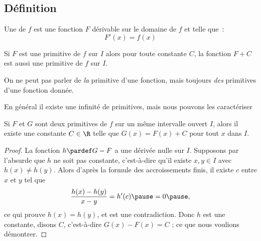 \subsection{Définition}
\begin{frame}
  \begin{definition}\pause{}
    Une  de $f$ est une fonction $F$ dérivable sur le domaine de \(f\) et telle que~:
    \begin{equation*}
      F'(x) = f(x)
    \end{equation*}
  \end{definition}
  \begin{remark}\pause{}
    Si $F$ est une primitive de $f$ sur $I$ alors pour toute constante \(C\), la fonction $F+C$ est aussi une primitive de $f$ sur $I$.
  \end{remark}
  \begin{remark*}\pause{}
    On ne peut pas parler de \emph{la} primitive d'une fonction, mais toujours \emph{des} primitives d'une fonction donnée.
  \end{remark*}
\end{frame}

\begin{frame}
  En général il existe une infinité de primitives, mais nous pouvons les caractériser\pause{}
  \begin{proposition}
    Si $F$ et $G$ sont deux primitives de $f$ sur un même intervalle ouvert $I$,\pause{} alors il existe une constante $C \in \R$ telle que $G(x)=F(x)+C$ pour tout $x$ dans $I$.
  \end{proposition}
  \begin{proof}\pause{}
    La fonction $h \pardef G-F$ a une dérivée nulle sur $I$.\pause{} Supposons par l'absurde que \(h\) ne soit pas constante\pause{}, c'est-à-dire qu'il existe \(x,y\in I\) avec \(h(x)\neq h(y)\).\pause{} Alors d'après la formule des accroissements finis\pause{}, il existe \(c\) entre \(x\) et \(y\) tel que
    \begin{equation*}
\frac{h(x)-h(y)}{x-y} = h'(c)\pause = 0\pause,
\end{equation*}
ce qui prouve \(h(x) = h(y)\), et est une contradiction.\pause{} Donc \(h\) est une constante, disons \(C\)\pause{}, c'est-à-dire \(G(x) - F(x) = C\) ; ce que nous voulions démontrer.
  \end{proof}
\end{frame}

